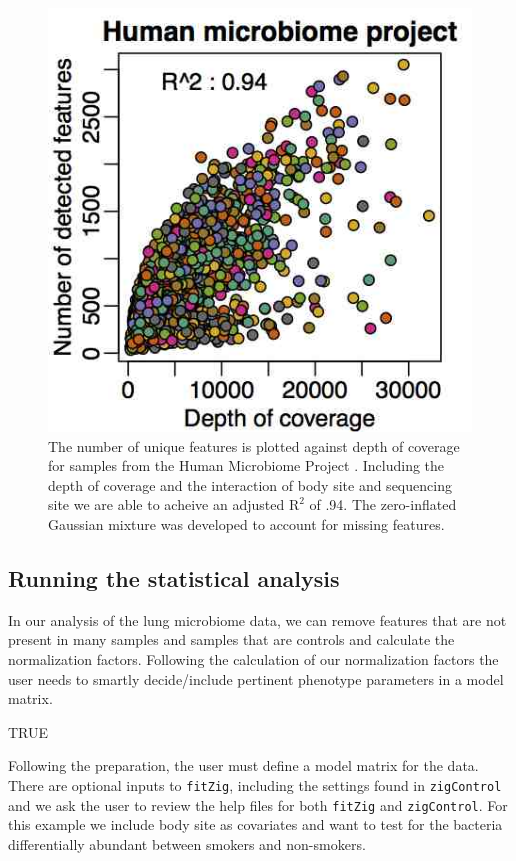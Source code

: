\documentclass[a4paper,12pt]{article}
\begin{document}
\begin{figure}
\centerline{\includegraphics[width=.55\textwidth]{metagenomeSeq_figure2.png}}
\caption{The number of unique features is plotted against depth of coverage for samples from the Human Microbiome Project \cite{hmp}. Including the depth of coverage and the interaction of body site and sequencing site we are able to acheive an adjusted $\mathrm{R}^2$ of .94. The zero-inflated Gaussian mixture was developed to account for missing features.}\label{fig2}
\end{figure}

\subsection{Running the statistical analysis}
In our analysis of the lung microbiome data, we can remove features that are not present in many samples and samples that are controls and calculate the normalization factors. Following the calculation of our normalization factors the user needs to smartly decide/include pertinent phenotype parameters in a model matrix. 

\begin{small}
\begin{Schunk}
\begin{Soutput}
[1] TRUE
\end{Soutput}
\end{Schunk}
\end{small}

Following the preparation, the user must define a model matrix for the data. There are optional inputs to \texttt{fitZig}, including the settings found in \texttt{zigControl} and we ask the user to review the help files for both \texttt{fitZig} and \texttt{zigControl}. For this example we include body site as covariates and want to test for the bacteria differentially abundant between smokers and non-smokers.
\end{document}

